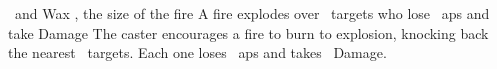   {\mAir\ and \mFire}%
  {Wax}%
  {\divergent, \duplicated}%
  {the size of the fire}%
  {A fire explodes over \spellArea\ targets who lose ~\glspl{ap} and take  Damage}%
  {
    The caster encourages a fire to burn to explosion, knocking back the nearest \spellArea\ targets.
    Each one loses ~\glspl{ap} and takes ~Damage.
  }
